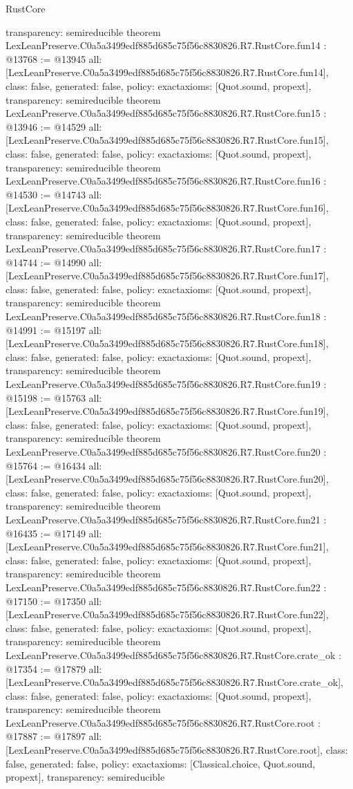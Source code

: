 \begin{lexlean}{RustCore}
\begin{coremodule}
{  transparency: semireducible
}
theorem LexLeanPreserve.C0a5a3499edf885d685c75f56c8830826.R7.RustCore.fun14 : @13768 := @13945 {
  all: [LexLeanPreserve.C0a5a3499edf885d685c75f56c8830826.R7.RustCore.fun14],
  class: false,
  generated: false,
  policy: exact{axioms: [Quot.sound, propext]},
  transparency: semireducible
}
theorem LexLeanPreserve.C0a5a3499edf885d685c75f56c8830826.R7.RustCore.fun15 : @13946 := @14529 {
  all: [LexLeanPreserve.C0a5a3499edf885d685c75f56c8830826.R7.RustCore.fun15],
  class: false,
  generated: false,
  policy: exact{axioms: [Quot.sound, propext]},
  transparency: semireducible
}
theorem LexLeanPreserve.C0a5a3499edf885d685c75f56c8830826.R7.RustCore.fun16 : @14530 := @14743 {
  all: [LexLeanPreserve.C0a5a3499edf885d685c75f56c8830826.R7.RustCore.fun16],
  class: false,
  generated: false,
  policy: exact{axioms: [Quot.sound, propext]},
  transparency: semireducible
}
theorem LexLeanPreserve.C0a5a3499edf885d685c75f56c8830826.R7.RustCore.fun17 : @14744 := @14990 {
  all: [LexLeanPreserve.C0a5a3499edf885d685c75f56c8830826.R7.RustCore.fun17],
  class: false,
  generated: false,
  policy: exact{axioms: [Quot.sound, propext]},
  transparency: semireducible
}
theorem LexLeanPreserve.C0a5a3499edf885d685c75f56c8830826.R7.RustCore.fun18 : @14991 := @15197 {
  all: [LexLeanPreserve.C0a5a3499edf885d685c75f56c8830826.R7.RustCore.fun18],
  class: false,
  generated: false,
  policy: exact{axioms: [Quot.sound, propext]},
  transparency: semireducible
}
theorem LexLeanPreserve.C0a5a3499edf885d685c75f56c8830826.R7.RustCore.fun19 : @15198 := @15763 {
  all: [LexLeanPreserve.C0a5a3499edf885d685c75f56c8830826.R7.RustCore.fun19],
  class: false,
  generated: false,
  policy: exact{axioms: [Quot.sound, propext]},
  transparency: semireducible
}
theorem LexLeanPreserve.C0a5a3499edf885d685c75f56c8830826.R7.RustCore.fun20 : @15764 := @16434 {
  all: [LexLeanPreserve.C0a5a3499edf885d685c75f56c8830826.R7.RustCore.fun20],
  class: false,
  generated: false,
  policy: exact{axioms: [Quot.sound, propext]},
  transparency: semireducible
}
theorem LexLeanPreserve.C0a5a3499edf885d685c75f56c8830826.R7.RustCore.fun21 : @16435 := @17149 {
  all: [LexLeanPreserve.C0a5a3499edf885d685c75f56c8830826.R7.RustCore.fun21],
  class: false,
  generated: false,
  policy: exact{axioms: [Quot.sound, propext]},
  transparency: semireducible
}
theorem LexLeanPreserve.C0a5a3499edf885d685c75f56c8830826.R7.RustCore.fun22 : @17150 := @17350 {
  all: [LexLeanPreserve.C0a5a3499edf885d685c75f56c8830826.R7.RustCore.fun22],
  class: false,
  generated: false,
  policy: exact{axioms: [Quot.sound, propext]},
  transparency: semireducible
}
theorem LexLeanPreserve.C0a5a3499edf885d685c75f56c8830826.R7.RustCore.crate_ok : @17354 := @17879 {
  all: [LexLeanPreserve.C0a5a3499edf885d685c75f56c8830826.R7.RustCore.crate_ok],
  class: false,
  generated: false,
  policy: exact{axioms: [Quot.sound, propext]},
  transparency: semireducible
}
theorem LexLeanPreserve.C0a5a3499edf885d685c75f56c8830826.R7.RustCore.root : @17887 := @17897 {
  all: [LexLeanPreserve.C0a5a3499edf885d685c75f56c8830826.R7.RustCore.root],
  class: false,
  generated: false,
  policy: exact{axioms: [Classical.choice, Quot.sound, propext]},
  transparency: semireducible
}


\end{coremodule}
\end{lexlean}
